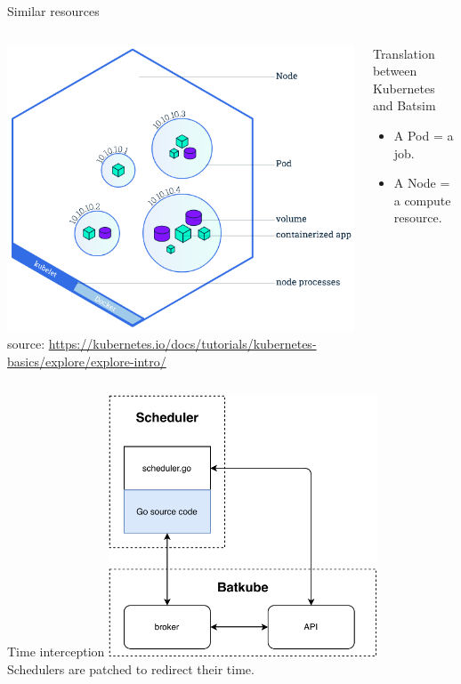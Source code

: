 \documentclass[12pt, aspectratio=43]{beamer}
\begin{document}
\begin{frame}{Similar resources}
	\begin{columns}
		\centering
		\includegraphics[width=\textwidth]{../imgs/node-overview.png}
		\tiny{source: \url{https://kubernetes.io/docs/tutorials/kubernetes-basics/explore/explore-intro/}}

		\begin{block}{Translation between Kubernetes and Batsim}
			\begin{itemize}
				\item A Pod = a job.
				\item A Node = a compute resource.
			\end{itemize}
		\end{block}
	\end{columns}
\end{frame}


\begin{frame}{Time interception}
	\centering
	\includegraphics[width=0.6\textwidth]{../imgs/synchro-go-sources.pdf}\\
	\small{Schedulers are patched to redirect their time.}
\end{frame}
\end{document}
